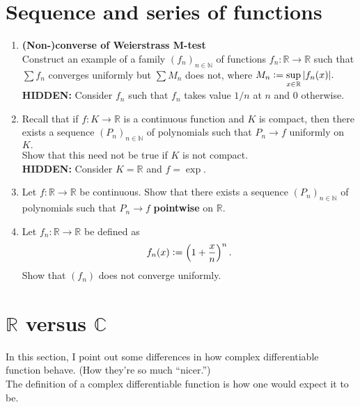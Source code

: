 \documentclass[12pt]{article}
\theoremstyle{definition}
\numberwithin{thm}{section}
\newcommand{\hint}[1]{\textbf{HIDDEN:} {\color[rgb]{0.95, 0.95, 0.95}#1}}
\begin{document}
\newpage\section{Sequence and series of functions}
\begin{enumerate}
	\item \textbf{(Non-)converse of Weierstrass M-test}\\
	Construct an example of a family $(f_n)_{n \in \mathbb{N}}$ of functions $f_n:\mathbb{R} \to \mathbb{R}$ such that $\sum f_n$ converges uniformly but $\sum M_n$ does not, where $M_n \vcentcolon= \displaystyle\sup_{x \in \mathbb{R}}|f_n(x)|.$\\
	\hint{Consider $f_n$ such that $f_n$ takes value $1/n$ at $n$ and $0$ otherwise.}
	\item Recall that if $f:K \to \mathbb{R}$ is a continuous function and $K$ is compact, then there exists a sequence $(P_n)_{n \in \mathbb{N}}$ of polynomials such that $P_n \to f$ uniformly on $K.$\\
	Show that this need not be true if $K$ is not compact.\\
	\hint{Consider $K = \mathbb{R}$ and $f = \exp.$}
	\item Let $f:\mathbb{R} \to \mathbb{R}$ be continuous. Show that there exists a sequence $(P_n)_{n \in \mathbb{N}}$ of polynomials such that $P_n \to f$ \textbf{pointwise} on $\mathbb{R}.$
	\item Let $f_n:\mathbb{R} \to \mathbb{R}$ be defined as
	\begin{equation*} 
		f_n(x) \vcentcolon= \left(1 + \dfrac{x}{n}\right)^n.
	\end{equation*}
	Show that $(f_n)$ does not converge uniformly.
\end{enumerate}
%
\newpage\section{\texorpdfstring{$\mathbb{R}$ versus $\mathbb{C}$}{R versus C}}
In this section, I point out some differences in how complex differentiable function behave. (How they're so much ``nicer.'')\\
The definition of a complex differentiable function is how one would expect it to be.
\end{document}
